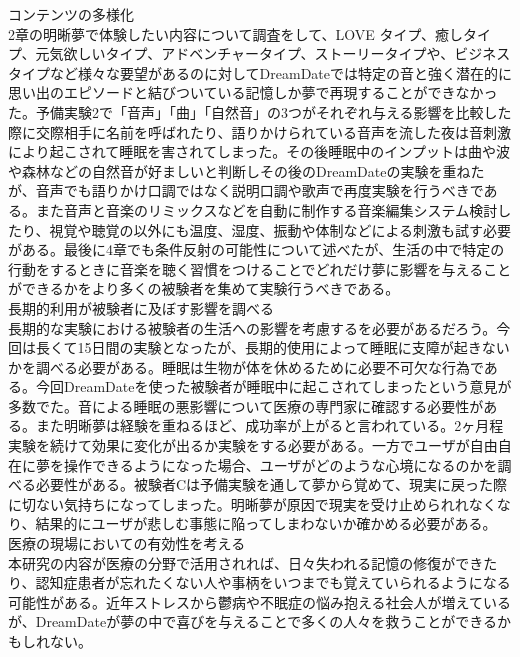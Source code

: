 コンテンツの多様化\\
2章の明晰夢で体験したい内容について調査をして、LOVE タイプ、癒しタイプ、元気欲しいタイプ、アドベンチャータイプ、ストーリータイプや、ビジネスタイプなど様々な要望があるのに対してDreamDateでは特定の音と強く潜在的に思い出のエピソードと結びついている記憶しか夢で再現することができなかった。予備実験2で「音声」「曲」「自然音」の3つがそれぞれ与える影響を比較した際に交際相手に名前を呼ばれたり、語りかけられている音声を流した夜は音刺激により起こされて睡眠を害されてしまった。その後睡眠中のインプットは曲や波や森林などの自然音が好ましいと判断しその後のDreamDateの実験を重ねたが、音声でも語りかけ口調ではなく説明口調や歌声で再度実験を行うべきである。また音声と音楽のリミックスなどを自動に制作する音楽編集システム検討したり、視覚や聴覚の以外にも温度、湿度、振動や体制などによる刺激も試す必要がある。最後に4章でも条件反射の可能性について述べたが、生活の中で特定の行動をするときに音楽を聴く習慣をつけることでどれだけ夢に影響を与えることができるかをより多くの被験者を集めて実験行うべきである。\\

長期的利用が被験者に及ぼす影響を調べる\\
長期的な実験における被験者の生活への影響を考慮するを必要があるだろう。今回は長くて15日間の実験となったが、長期的使用によって睡眠に支障が起きないかを調べる必要がある。睡眠は生物が体を休めるために必要不可欠な行為である。今回DreamDateを使った被験者が睡眠中に起こされてしまったという意見が多数でた。音による睡眠の悪影響について医療の専門家に確認する必要性がある。また明晰夢は経験を重ねるほど、成功率が上がると言われている\cite{LaBerge}。2ヶ月程実験を続けて効果に変化が出るか実験をする必要がある。一方でユーザが自由自在に夢を操作できるようになった場合、ユーザがどのような心境になるのかを調べる必要性がある。被験者Cは予備実験を通して夢から覚めて、現実に戻った際に切ない気持ちになってしまった。明晰夢が原因で現実を受け止められれなくなり、結果的にユーザが悲しむ事態に陥ってしまわないか確かめる必要がある。\\

医療の現場においての有効性を考える\\
本研究の内容が医療の分野で活用されれば、日々失われる記憶の修復ができたり、認知症患者が忘れたくない人や事柄をいつまでも覚えていられるようになる可能性がある。近年ストレスから鬱病や不眠症の悩み抱える社会人が増えているが、DreamDateが夢の中で喜びを与えることで多くの人々を救うことができるかもしれない。\\